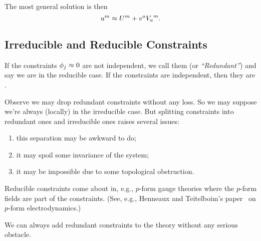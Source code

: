 The most general solution is then
\begin{equation}
u^{m}\approx U^{m} + v^{a}{V_{a}}^{m}.
\end{equation}

\subsection{Irreducible and Reducible Constraints}
\begin{defn}
If the constraints $\phi_{j}\approx0$ are not independent, we call them
 (or \emph{``Redundant''}) and say we are in the
reducible case. If the constraints are independent, then they are
.
\end{defn}

\M
Observe we may drop redundant constraints without any loss. So we may
suppose we're always (locally) in the irreducible case. But splitting
constraints into redundant ones and irreducible ones raises several
issues:
\begin{enumerate}
\item this separation may be awkward to do;
\item it may spoil some invariance of the system;
\item it may be impossible due to some topological obstruction.
\end{enumerate}

\M
Reducible constraints come about in, e.g., $p$-form gauge theories where
the $p$-form fields are part of the constraints. (See, e.g., Henneaux
and Teitelboim's paper~\cite{Henneaux:1986ht} on $p$-form electrodynamics.)

\M
We can always add redundant constraints to the theory without any
serious obstacle.


